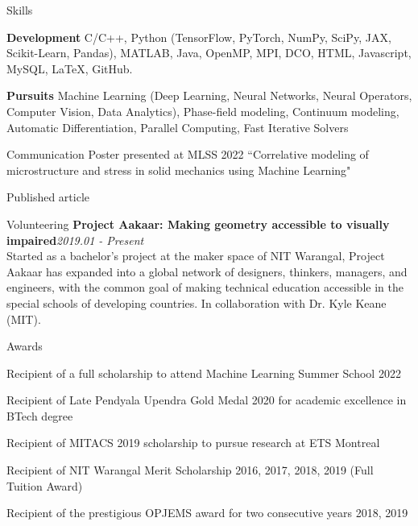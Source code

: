 \documentclass{resume}
\begin{document}
\begin{rSection}{Skills}
  \item \textbf{Development} \textemdash  C/C++, Python (TensorFlow, PyTorch, NumPy, SciPy, JAX, Scikit-Learn, Pandas), MATLAB, Java, OpenMP, MPI, DCO,  HTML, Javascript, MySQL, {\LaTeX}, GitHub.
  \item \textbf{Pursuits} \textemdash Machine Learning (Deep Learning, Neural Networks, Neural Operators, Computer Vision, Data Analytics), Phase-field modeling, Continuum modeling, Automatic Differentiation, Parallel Computing, Fast Iterative Solvers
\end{rSection}

\begin{rSection}{Communication}
Poster presented at MLSS 2022 \textemdash``Correlative modeling of microstructure and stress in solid mechanics using Machine Learning"

Published article \textemdash{}

\end{rSection}


\begin{rSection}{Volunteering}
{\bf Project Aakaar: Making geometry accessible to visually impaired}\hfill {\em 2019.01 - Present}\\
Started as a bachelor's project at the maker space of NIT Warangal, Project Aakaar has expanded into a global network of designers, thinkers, managers, and engineers, with the common goal of making technical education accessible in the special schools of developing countries. In collaboration with Dr. Kyle Keane (MIT).
\end{rSection}

\begin{rSection}{Awards} \itemsep -3pt
\item Recipient of a full scholarship to attend Machine Learning Summer School 2022
\item Recipient of Late Pendyala Upendra Gold Medal 2020 for academic excellence in BTech degree
\item Recipient of MITACS 2019 scholarship to pursue research at ETS Montreal \hfill 
\item Recipient of NIT Warangal Merit Scholarship 2016, 2017, 2018, 2019 (Full Tuition Award)
\item Recipient of the prestigious OPJEMS award for two consecutive years 2018, 2019 \hfill 


\end{rSection}
\end{document}
